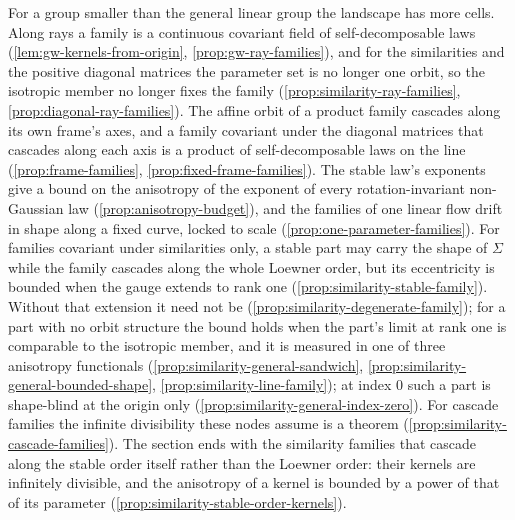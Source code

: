 For a group smaller than the general linear group the landscape has more cells. Along rays a family
is a continuous covariant field of self-decomposable laws (\ref{lem:gw-kernels-from-origin},
\ref{prop:gw-ray-families}), and for the similarities and the positive diagonal matrices the
parameter set is no longer one orbit, so the isotropic member no longer fixes the family
(\ref{prop:similarity-ray-families}, \ref{prop:diagonal-ray-families}). The affine orbit of a product
family cascades along its own frame's axes, and a family covariant under the diagonal matrices that
cascades along each axis is a product of self-decomposable laws on the line
(\ref{prop:frame-families}, \ref{prop:fixed-frame-families}). The stable law's exponents give a bound
on the anisotropy of the exponent of every rotation-invariant non-Gaussian law
(\ref{prop:anisotropy-budget}), and the families of one linear flow drift in shape along a fixed
curve, locked to scale (\ref{prop:one-parameter-families}). For families covariant under similarities
only, a stable part may carry the shape of $\Sigma$ while the family cascades along the whole Loewner
order, but its eccentricity is bounded when the gauge extends to rank one
(\ref{prop:similarity-stable-family}). Without that extension it need not be
(\ref{prop:similarity-degenerate-family}); for a part with no orbit structure the bound holds when the
part's limit at rank one is comparable to the isotropic member, and it is measured in one of three
anisotropy functionals (\ref{prop:similarity-general-sandwich}, \ref{prop:similarity-general-bounded-shape},
\ref{prop:similarity-line-family}); at index $0$ such a part is shape-blind at the origin only
(\ref{prop:similarity-general-index-zero}). For cascade families the infinite divisibility these nodes
assume is a theorem (\ref{prop:similarity-cascade-families}). The section ends with the similarity
families that cascade along the stable order itself rather than the Loewner order: their kernels are
infinitely divisible, and the anisotropy of a kernel is bounded by a power of that of its parameter
(\ref{prop:similarity-stable-order-kernels}).

